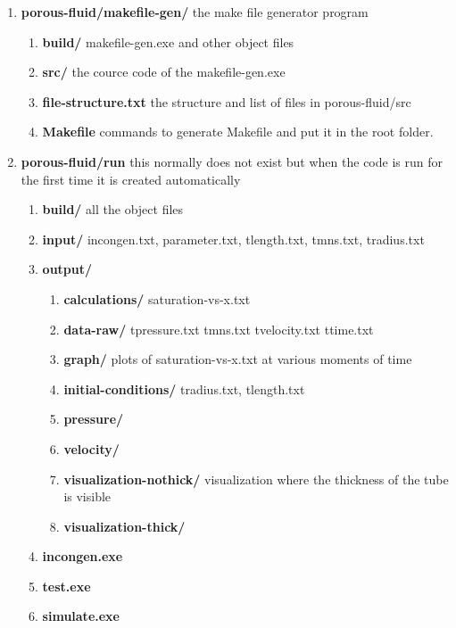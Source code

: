 \documentclass[
	12pt
] {article}
\begin{document}
\begin{enumerate}
		\item \textbf{porous-fluid/makefile-gen/} the make file generator program
			\begin{enumerate}
				\item \textbf{build/} makefile-gen.exe and other object files 
				\item \textbf{src/} the cource code of the makefile-gen.exe
				\item \textbf{file-structure.txt} the structure and list of files in porous-fluid/src
				\item \textbf{Makefile} commands to generate Makefile and put it in the root folder.
			\end{enumerate}
		\item \textbf{porous-fluid/run} this normally does not exist but when the code is run for the first time it is created automatically
			\begin{enumerate}
				\item \textbf{build/} all the object files
				\item \textbf{input/} incongen.txt, parameter.txt, tlength.txt, tmns.txt, tradius.txt
				\item \textbf{output/}
					\begin{enumerate}
						\item \textbf{calculations/} saturation-vs-x.txt
						\item \textbf{data-raw/} tpressure.txt tmns.txt tvelocity.txt ttime.txt 
						\item \textbf{graph/} plots of saturation-vs-x.txt at various moments of time
						\item \textbf{initial-conditions/} tradius.txt, tlength.txt
						\item \textbf{pressure/}
						\item \textbf{velocity/} 
						\item \textbf{visualization-nothick/} visualization where the thickness of the tube is visible
						\item \textbf{visualization-thick/}
					\end{enumerate}
				\item \textbf{incongen.exe}
				\item \textbf{test.exe}
				\item \textbf{simulate.exe}
			\end{enumerate}
	\end{enumerate}
\end{document}
